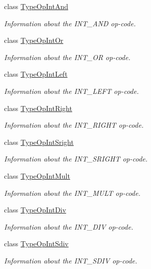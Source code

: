 \begin{DoxyCompactItemize}
class \mbox{\hyperlink{class_type_op_int_and}{Type\+Op\+Int\+And}}
\begin{DoxyCompactList}\small\item\em Information about the I\+N\+T\+\_\+\+A\+ND op-\/code. \end{DoxyCompactList}\item 
class \mbox{\hyperlink{class_type_op_int_or}{Type\+Op\+Int\+Or}}
\begin{DoxyCompactList}\small\item\em Information about the I\+N\+T\+\_\+\+OR op-\/code. \end{DoxyCompactList}\item 
class \mbox{\hyperlink{class_type_op_int_left}{Type\+Op\+Int\+Left}}
\begin{DoxyCompactList}\small\item\em Information about the I\+N\+T\+\_\+\+L\+E\+FT op-\/code. \end{DoxyCompactList}\item 
class \mbox{\hyperlink{class_type_op_int_right}{Type\+Op\+Int\+Right}}
\begin{DoxyCompactList}\small\item\em Information about the I\+N\+T\+\_\+\+R\+I\+G\+HT op-\/code. \end{DoxyCompactList}\item 
class \mbox{\hyperlink{class_type_op_int_sright}{Type\+Op\+Int\+Sright}}
\begin{DoxyCompactList}\small\item\em Information about the I\+N\+T\+\_\+\+S\+R\+I\+G\+HT op-\/code. \end{DoxyCompactList}\item 
class \mbox{\hyperlink{class_type_op_int_mult}{Type\+Op\+Int\+Mult}}
\begin{DoxyCompactList}\small\item\em Information about the I\+N\+T\+\_\+\+M\+U\+LT op-\/code. \end{DoxyCompactList}\item 
class \mbox{\hyperlink{class_type_op_int_div}{Type\+Op\+Int\+Div}}
\begin{DoxyCompactList}\small\item\em Information about the I\+N\+T\+\_\+\+D\+IV op-\/code. \end{DoxyCompactList}\item 
class \mbox{\hyperlink{class_type_op_int_sdiv}{Type\+Op\+Int\+Sdiv}}
\begin{DoxyCompactList}\small\item\em Information about the I\+N\+T\+\_\+\+S\+D\+IV op-\/code. \end{DoxyCompactList}\item 

\end{DoxyCompactItemize}
